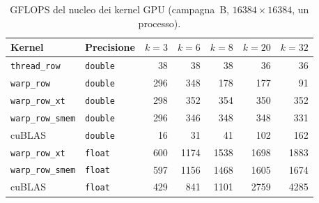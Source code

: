\documentclass[11pt,a4paper]{article}
\begin{document}
\begin{table}[H]
  \centering
  \caption{GFLOPS del nucleo dei kernel GPU (campagna~B,
    $16384 \times 16384$, un processo).}\label{tab:ris-kernel}
  \begin{tabular}{llrrrrr}
    \toprule
    Kernel & Precisione & $k=3$ & $k=6$ & $k=8$ & $k=20$ & $k=32$ \\
    \midrule
    \texttt{thread\_row}    & \texttt{double} &  38 &   38 &   38 &   36 &   36 \\
    \texttt{warp\_row}      & \texttt{double} & 296 &  348 &  178 &  177 &   91 \\
    \texttt{warp\_row\_xt}  & \texttt{double} & 298 &  352 &  354 &  350 &  352 \\
    \texttt{warp\_row\_smem}& \texttt{double} & 296 &  346 &  348 &  348 &  331 \\
    cuBLAS                  & \texttt{double} &  16 &   31 &   41 &  102 &  162 \\
    \midrule
    \texttt{warp\_row\_xt}  & \texttt{float}  & 600 & 1174 & 1538 & 1698 & 1883 \\
    \texttt{warp\_row\_smem}& \texttt{float}  & 597 & 1156 & 1468 & 1605 & 1674 \\
    cuBLAS                  & \texttt{float}  & 429 &  841 & 1101 & 2759 & 4285 \\
    \bottomrule
  \end{tabular}
\end{table}
\end{document}
